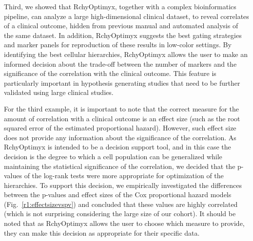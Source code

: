 Third, we showed that RchyOptimyx, together with a complex bioinformatics pipeline, can analyze a large high-dimensional clinical dataset, to reveal correlates of a clinical outcome, hidden from previous manual and automated analysis of the same dataset.
In addition, RchyOptimyx suggests the best gating strategies and marker panels for reproduction of these results in low-color settings.
By identifying the best cellular hierarchies, RchyOptimyx allows the user to make an informed decision about the trade-off between the number of markers and the significance of the correlation with the clinical outcome.
This feature is particularly important in hypothesis generating studies that need to be further validated using large clinical studies.

For the third example, it is important to note that the correct measure for the amount of correlation with a clinical outcome is an effect size (such as the root squared error of the estimated proportional hazard). 
However, such effect size does not provide any information about the significance of the correlation. 
As RchyOptimyx is intended to be a decision support tool, and in this case the decision is the degree to which a cell population can be generalized while maintaining the statistical significance of the correlation, we decided that the p-values of the log-rank tests were more appropriate for optimization of the hierarchies.
To support this decision, we empirically investigated the differences between the p-values and effect sizes of the Cox proportional hazard models (Fig.~\ref{r1:effectsizevspv}) and concluded that these values are highly correlated (which is not surprising considering the large size of our cohort).
It should be noted that as RchyOptimyx allows the user to choose which measure to provide, they can make this decision as appropriate for their specific data.

